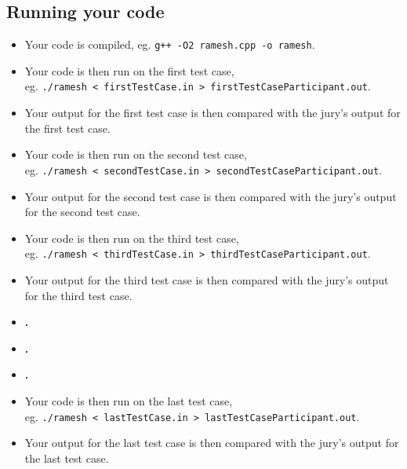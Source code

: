     \subsection{Running your code}
        \begin{itemize}
            \item
                Your code is compiled, eg. \verb|g++ -O2 ramesh.cpp -o ramesh|.
            \item
                Your code is then run on the first test case,\\eg. \verb|./ramesh < firstTestCase.in > firstTestCaseParticipant.out|.
            \item
                Your output for the first test case is then compared with the jury's output for the first test case.
            \item
                Your code is then run on the second test case,\\ eg. \verb|./ramesh < secondTestCase.in > secondTestCaseParticipant.out|.
            \item
                Your output for the second test case is then compared with the jury's output for the second test case.
            \item
                Your code is then run on the third test case,\\ eg. \verb|./ramesh < thirdTestCase.in > thirdTestCaseParticipant.out|.
            \item
                Your output for the third test case is then compared with the jury's output for the third test case.
            \item[] \begin{center} \textbf{.} \end{center}
            \item[] \begin{center} \textbf{.} \end{center}
            \item[] \begin{center} \textbf{.} \end{center}
            \item
                Your code is then run on the last test case,\\ eg. \verb|./ramesh < lastTestCase.in > lastTestCaseParticipant.out|.
            \item
                Your output for the last test case is then compared with the jury's output for the last test case.
        \end{itemize}

